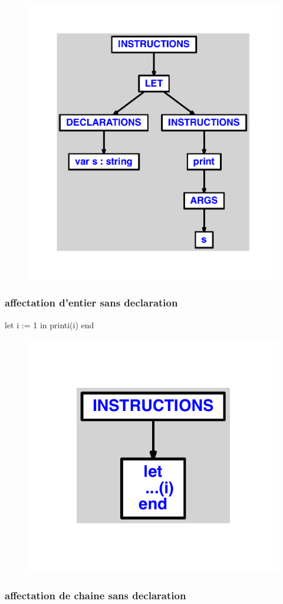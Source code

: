 \documentclass{article}
\begin{document}
\begin{figure}[H]\centering\includegraphics[max width=\textwidth]{ast/ast_281.pdf}\end{figure}\subsubsection{affectation d'entier sans declaration}
\begin{verbatimtab}
let
	i := 1
in
	printi(i)
end
\end{verbatimtab}
\begin{figure}[H]\centering\includegraphics[max width=\textwidth]{ast/ast_282.pdf}\end{figure}\subsubsection{affectation de chaine sans declaration}
\end{document}
